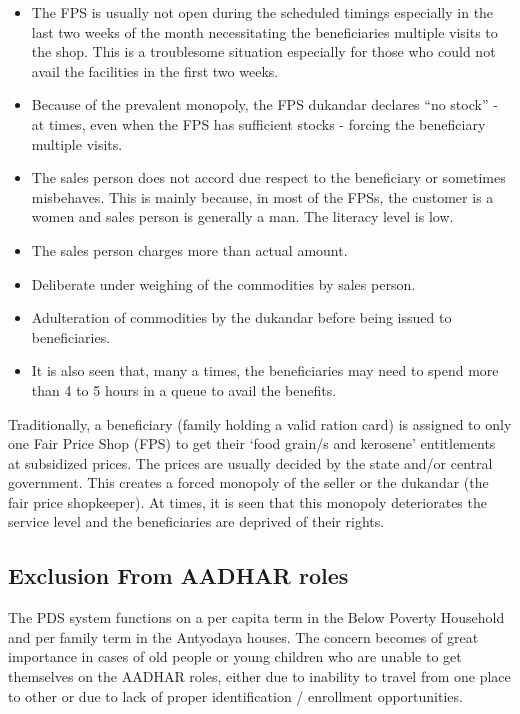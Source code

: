 \documentclass[a4paper,12pt]{extarticle}
\begin{document}
\begin{itemize}
\item  The FPS is usually not open during the scheduled timings especially in the last two weeks of the month necessitating the beneficiaries multiple visits to the shop. This is a troublesome situation especially for those who could not avail the facilities in the first two weeks.
\item  Because of the prevalent monopoly, the FPS dukandar declares “no stock” - at times, even when the FPS has sufficient stocks - forcing the beneficiary multiple visits.
\item  The sales person does not accord due respect to the beneficiary or sometimes misbehaves. This is mainly because, in most of the FPSs, the customer is a women and sales person is generally a man. The literacy level is low.
\item  The sales person charges more than actual amount.
\item  Deliberate under weighing of the commodities by sales person.
\item  Adulteration of commodities by the dukandar before being issued to beneficiaries.
\item  It is also seen that, many a times, the beneficiaries may need to spend more than 4 to 5 hours in a queue to avail the benefits.
\end{itemize}
Traditionally, a beneficiary (family holding a valid ration card) is assigned to only one Fair Price Shop (FPS) to get their ‘food grain/s and kerosene’ entitlements at subsidized prices. The prices are usually decided by the state and/or central government. This creates a forced monopoly of the seller or the dukandar (the fair price shopkeeper). At times, it is seen that this monopoly deteriorates the service level and the beneficiaries are deprived of their rights.



\subsection{Exclusion From AADHAR roles}
The PDS system functions on a per capita term in the Below Poverty Household and per family term in the Antyodaya houses. 
The concern becomes of great importance in cases of old people or young children who are unable to get themselves on the AADHAR roles, either due to inability to travel from one place to other or due to lack of proper identification / enrollment opportunities.
\end{document}
